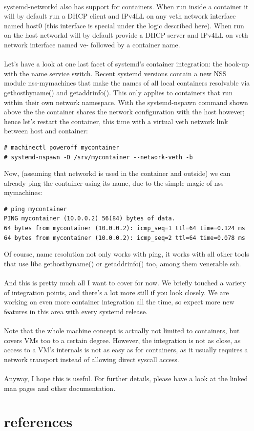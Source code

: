 \documentclass[titlepage]{article}
\begin{document}
\\
systemd-networkd also has support for containers. When run inside a container it will by default run a DHCP client and IPv4LL on any veth network interface named host0 (this interface is special under the logic described here). When run on the host networkd will by default provide a DHCP server and IPv4LL on veth network interface named ve- followed by a container name.
\\
\\
Let's have a look at one last facet of systemd's container integration: the hook-up with the name service switch. Recent systemd versions contain a new NSS module nss-mymachines that make the names of all local containers resolvable via gethostbyname() and getaddrinfo(). This only applies to containers that run within their own network namespace. With the systemd-nspawn command shown above the the container shares the network configuration with the host however; hence let's restart the container, this time with a virtual veth network link between host and container:
\begin{lstlisting}
# machinectl poweroff mycontainer
# systemd-nspawn -D /srv/mycontainer --network-veth -b
\end{lstlisting}
Now, (assuming that networkd is used in the container and outside) we can already ping the container using its name, due to the simple magic of nss-mymachines:
\begin{lstlisting}
# ping mycontainer
PING mycontainer (10.0.0.2) 56(84) bytes of data.
64 bytes from mycontainer (10.0.0.2): icmp_seq=1 ttl=64 time=0.124 ms
64 bytes from mycontainer (10.0.0.2): icmp_seq=2 ttl=64 time=0.078 ms
\end{lstlisting}
Of course, name resolution not only works with ping, it works with all other tools that use libc gethostbyname() or getaddrinfo() too, among them venerable ssh.
\\
\\
And this is pretty much all I want to cover for now. We briefly touched a variety of integration points, and there's a lot more still if you look closely. We are working on even more container integration all the time, so expect more new features in this area with every systemd release.
\\
\\
Note that the whole machine concept is actually not limited to containers, but covers VMs too to a certain degree. However, the integration is not as close, as access to a VM's internals is not as easy as for containers, as it usually requires a network transport instead of allowing direct syscall access.
\\
\\
Anyway, I hope this is useful. For further details, please have a look at the linked man pages and other documentation.
\section{references}
\nocite{*}


\end{document}
